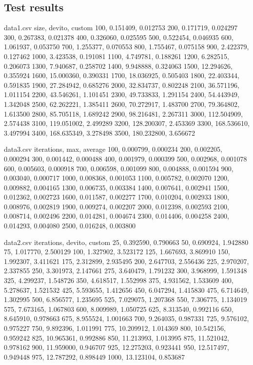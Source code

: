 \documentclass{article}
\begin{document}
\subsection*{Test results}
\begin{filecontents*}{data1.csv}
	size, devito, custom
	100, 0.151409, 0.012753
	200, 0.171719, 0.024297
	300, 0.267383, 0.021378
	400, 0.326060, 0.025595
	500, 0.522454, 0.046935
	600, 1.061937, 0.053750
	700, 1.255377, 0.070553
	800, 1.755467, 0.075158
	900, 2.422379, 0.127462
	1000, 3.423538, 0.191081
	1100, 4.749781, 0.188261
	1200, 6.282515, 0.206073
	1300, 7.940687, 0.258702
	1400, 9.948888, 0.324063
	1500, 12.294626, 0.355924
	1600, 15.000360, 0.390331
	1700, 18.036925, 0.505403
	1800, 22.403344, 0.591835
	1900, 27.284942, 0.685276
	2000, 32.834737, 0.802248
	2100, 36.571196, 1.011154
	2200, 43.546261, 1.101451
	2300, 49.733833, 1.291154
	2400, 54.443949, 1.342048
	2500, 62.262221, 1.385411
	2600, 70.272917, 1.483700
	2700, 79.364802, 1.613500
	2800, 85.705118, 1.689242
	2900, 98.216481, 2.267311
	3000, 112.504909, 2.574438
	3100, 119.051002, 2.499289
	3200, 128.200307, 2.453369
	3300, 168.536610, 3.497994
	3400, 168.635349, 3.278498
	3500, 180.232800, 3.656672
\end{filecontents*}
\begin{filecontents*}{data3.csv}
	iterations, max, average
	100, 0.000799, 0.000234
	200, 0.002205, 0.000294
	300, 0.001442, 0.000488
	400, 0.001979, 0.000399
	500, 0.002968, 0.001078
	600, 0.005603, 0.000918
	700, 0.006598, 0.001099
	800, 0.004888, 0.001594
	900, 0.003040, 0.000717
	1000, 0.008368, 0.001053
	1100, 0.005782, 0.002070
	1200, 0.009882, 0.004165
	1300, 0.006735, 0.003384
	1400, 0.007641, 0.002941
	1500, 0.012362, 0.002723
	1600, 0.011587, 0.002277
	1700, 0.010204, 0.002933
	1800, 0.008976, 0.002819
	1900, 0.009274, 0.002207
	2000, 0.012398, 0.002593
	2100, 0.008714, 0.002496
	2200, 0.014281, 0.004674
	2300, 0.014406, 0.004258
	2400, 0.014293, 0.004080
	2500, 0.016248, 0.003800
\end{filecontents*}
\begin{filecontents*}{data2.csv}
	iterations, devito, custom
	25, 0.392590, 0.790663
	50, 0.690924, 1.942880
	75, 1.017770, 2.500129
	100, 1.327902, 3.523172
	125, 1.667693, 3.869910
	150, 1.992307, 3.411621
	175, 2.312899, 2.935495
	200, 2.647703, 2.556436
	225, 2.970207, 2.337855
	250, 3.301973, 2.147661
	275, 3.640479, 1.791232
	300, 3.968999, 1.591348
	325, 4.299237, 1.548726
	350, 4.618517, 1.552998
	375, 4.931562, 1.533609
	400, 5.278637, 1.521532
	425, 5.593655, 1.412656
	450, 6.047294, 1.415830
	475, 6.714649, 1.302995
	500, 6.856577, 1.235695
	525, 7.029075, 1.207368
	550, 7.306775, 1.134019
	575, 7.673165, 1.067803
	600, 8.009989, 1.050725
	625, 8.313540, 0.992116
	650, 8.645910, 0.978663
	675, 8.955524, 1.001663
	700, 9.264035, 0.987331
	725, 9.576102, 0.975227
	750, 9.892396, 1.011991
	775, 10.209912, 1.014369
	800, 10.542156, 0.959242
	825, 10.965361, 0.992886
	850, 11.213993, 1.013995
	875, 11.521042, 0.978162
	900, 11.959000, 0.946707
	925, 12.275203, 0.923441
	950, 12.517497, 0.949448
	975, 12.787292, 0.898449
	1000, 13.123104, 0.853687
\end{filecontents*}
\end{document}
